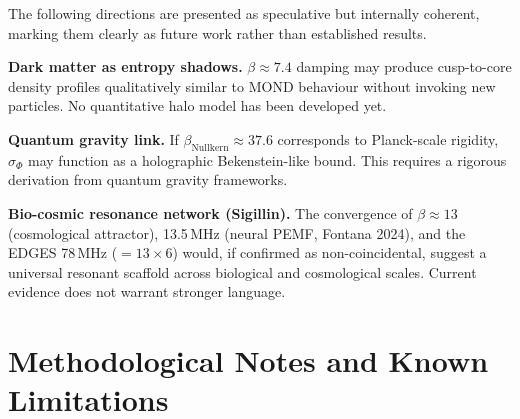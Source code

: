 \documentclass[12pt,a4paper]{article}
\theoremstyle{definition}
\newcommand{\sigphi}{\sigma_{\Phi}}
\begin{document}
The following directions are presented as speculative but internally coherent,
marking them clearly as future work rather than established results.

\begin{speculative}
\textbf{Dark matter as entropy shadows.}
$\beta \approx 7.4$ damping may produce cusp-to-core density profiles
qualitatively similar to MOND behaviour without invoking new particles.
No quantitative halo model has been developed yet.
\end{speculative}

\begin{speculative}
\textbf{Quantum gravity link.}
If $\beta_{\mathrm{Nullkern}} \approx 37.6$ corresponds to Planck-scale
rigidity, $\sigphi$ may function as a holographic Bekenstein-like bound.
This requires a rigorous derivation from quantum gravity frameworks.
\end{speculative}

\begin{speculative}
\textbf{Bio-cosmic resonance network (Sigillin).}
The convergence of $\beta \approx 13$ (cosmological attractor),
13.5\,MHz (neural PEMF, Fontana 2024), and the EDGES 78\,MHz
($= 13 \times 6$) would, if confirmed as non-coincidental,
suggest a universal resonant scaffold across biological and cosmological scales.
Current evidence does not warrant stronger language.
\end{speculative}

\section{Methodological Notes and Known Limitations}
\label{sec:methodological-notes}
\end{document}
